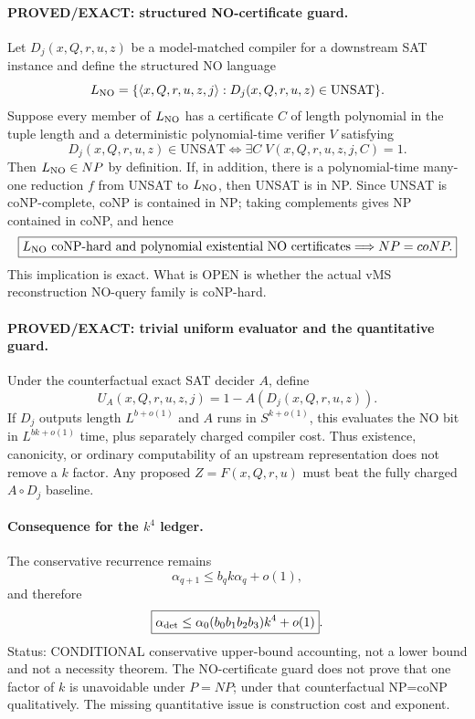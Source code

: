 \documentclass[11pt]{article}
\begin{document}
\paragraph{PROVED/EXACT: structured NO-certificate guard.}
Let $D_j(x,Q,r,u,z)$ be a model-matched compiler for a downstream SAT instance and define the structured NO language
\[
L_{\rm NO}=\{\langle x,Q,r,u,z,j\rangle: D_j(x,Q,r,u,z)\in\mathrm{UNSAT}\}.
\]
Suppose every member of $L_{\rm NO}$ has a certificate $C$ of length polynomial in the tuple length and a deterministic polynomial-time verifier $V$ satisfying
\[
D_j(x,Q,r,u,z)\in\mathrm{UNSAT}\iff\exists C\;V(x,Q,r,u,z,j,C)=1.
\]
Then $L_{\rm NO}\in NP$ by definition. If, in addition, there is a polynomial-time many-one reduction $f$ from UNSAT to $L_{\rm NO}$, then UNSAT is in NP. Since UNSAT is coNP-complete, coNP is contained in NP; taking complements gives NP contained in coNP, and hence
\[
\boxed{L_{\rm NO}\text{ coNP-hard and polynomial existential NO certificates}\Longrightarrow NP=coNP.}
\]
This implication is exact. What is OPEN is whether the actual vMS reconstruction NO-query family is coNP-hard.

\paragraph{PROVED/EXACT: trivial uniform evaluator and the quantitative guard.}
Under the counterfactual exact SAT decider $A$, define
\[
U_A(x,Q,r,u,z,j)=1-A(D_j(x,Q,r,u,z)).
\]
If $D_j$ outputs length $L^{b+o(1)}$ and $A$ runs in $S^{k+o(1)}$, this evaluates the NO bit in $L^{bk+o(1)}$ time, plus separately charged compiler cost. Thus existence, canonicity, or ordinary computability of an upstream representation does not remove a $k$ factor. Any proposed $Z=F(x,Q,r,u)$ must beat the fully charged $A\circ D_j$ baseline.

\paragraph{Consequence for the $k^4$ ledger.}
The conservative recurrence remains
\[
\alpha_{q+1}\le b_qk\alpha_q+o(1),
\]
and therefore
\[
\boxed{\alpha_{\rm det}\le\alpha_0(b_0b_1b_2b_3)k^4+o(1)}.
\]
Status: CONDITIONAL conservative upper-bound accounting, not a lower bound and not a necessity theorem. The NO-certificate guard does not prove that one factor of $k$ is unavoidable under $P=NP$; under that counterfactual NP=coNP qualitatively. The missing quantitative issue is construction cost and exponent.
\end{document}
